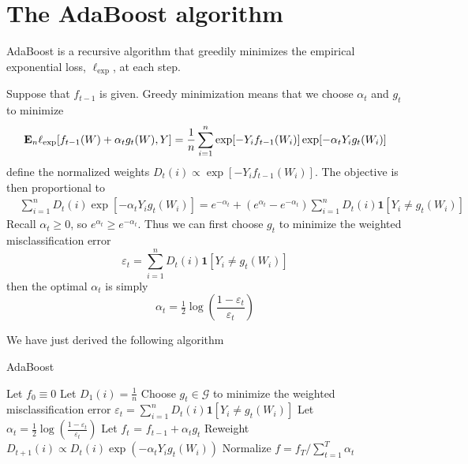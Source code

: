 \section{The AdaBoost algorithm}
\label{sec:adaboost_derive}

AdaBoost is a recursive algorithm that greedily minimizes the empirical exponential loss, $\ell_\text{exp}$, at each step.

Suppose that $f_{t-1}$ is given. Greedy minimization means that we choose $\alpha_t$ and $g_t$ to minimize
\begin{equation*}
	\mathbf{E}_n \ell_\text{exp} [f_{t-1}(W) + \alpha_t g_t(W), Y] = \frac{1}{n} \sum_{i=1}^n \exp[-Y_i f_{t-1}(W_i)]\exp[-\alpha_t Y_i g_t(W_i)]
\end{equation*}
define the normalized weights $D_t(i) \propto \exp[-Y_i f_{t-1}(W_i)]$. The objective is then proportional to
\begin{align}
	\label{eq:adaboost_empirical_loss}
	&\sum_{i=1}^n D_t(i)\exp[-\alpha_t Y_i g_t(W_i)] = e^{-\alpha_t} + (e^{\alpha_t} - e^{-\alpha_t}) \sum_{i=1}^n D_t(i)\mathbf{1}[Y_i \ne g_t(W_i)]
\end{align}
Recall $\alpha_t \ge 0$, so $e^{\alpha_t} \ge e^{-\alpha_t}$. Thus we can first choose $g_t$ to minimize the weighted misclassification error
\begin{equation*}
	\varepsilon_t = \sum_{i=1}^n D_t(i)\mathbf{1}[Y_i \ne g_t(W_i)]
\end{equation*}
then the optimal $\alpha_t$ is simply
\begin{equation}
	\label{eq:adaboost_alpha_optim}
	\alpha_t = \tfrac{1}{2}\log \left(\frac{1 - \varepsilon_t}{\varepsilon_t}\right)
\end{equation}

We have just derived the following algorithm
\begin{algorithm}
\caption{AdaBoost}
   \begin{algorithmic}[1] \label{alg:adaboost}
   \STATE Let $f_0 \equiv 0$
   \STATE Let $D_1(i) = \tfrac{1}{n}$
   	\STATE Choose $g_t \in \mathcal{G}$ to minimize the weighted misclassification error $\varepsilon_t = \sum_{i=1}^n D_t(i)\mathbf{1}[Y_i \ne g_t(W_i)]$
   	\STATE Let $\alpha_t = \tfrac{1}{2}\log \left(\frac{1 - \varepsilon_t}{\varepsilon_t}\right)$
    \STATE Let $f_t$ = $f_{t-1} + \alpha_t g_t$
    \STATE Reweight $D_{t+1}(i) \propto D_{t}(i)\exp(-\alpha_t Y_i g_t(W_i))$
   \ENDFOR  
   \STATE Normalize $f = f_T/\sum_{t=1}^T \alpha_t$
\end{algorithmic}
\end{algorithm}

